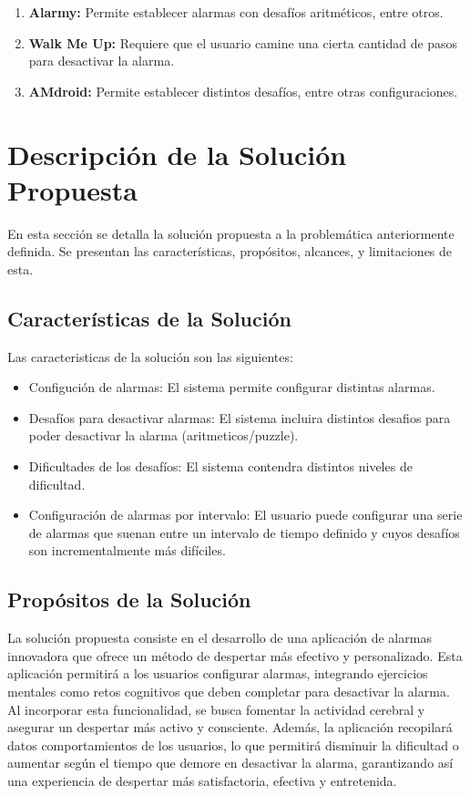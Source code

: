 \documentclass[letterpaper, 10pt]{article}
\begin{document}
	\begin{enumerate}
		\item[] \textbf{Alarmy:} Permite establecer alarmas con desafíos aritméticos, entre otros.
		\item[] \textbf{Walk Me Up:} Requiere que el usuario camine una cierta cantidad de pasos para desactivar la alarma.
		\item[] \textbf{AMdroid:} Permite establecer distintos desafíos, entre otras configuraciones.
	\end{enumerate}

\section{Descripción de la Solución Propuesta}
En esta sección se detalla la solución propuesta a la problemática anteriormente definida. Se presentan las características, propósitos, alcances, y limitaciones de esta.
\subsection{Características de la Solución}
Las caracteristicas de la solución son las siguientes:

\begin{itemize}
    \item Configución de alarmas: El sistema permite configurar distintas alarmas.
    \item Desafíos para desactivar alarmas: El sistema incluira distintos desafios para poder desactivar la alarma (aritmeticos/puzzle).
    \item Dificultades de los desafíos: El sistema contendra distintos niveles de dificultad.
    \item Configuración de alarmas por intervalo: El usuario puede configurar una serie de alarmas que suenan entre un intervalo de tiempo definido y cuyos desafíos son incrementalmente más difíciles.
\end{itemize}
\subsection{Propósitos de la Solución}
La solución propuesta consiste en el desarrollo de una aplicación de alarmas innovadora que ofrece un método de despertar más efectivo y personalizado. Esta aplicación permitirá a los usuarios configurar alarmas, integrando ejercicios mentales como retos cognitivos que deben completar para desactivar la alarma. Al incorporar esta funcionalidad, se busca fomentar la actividad cerebral y asegurar un despertar más activo y consciente. Además, la aplicación recopilará datos comportamientos de los usuarios, lo que permitirá disminuir la dificultad o aumentar según el tiempo que demore en desactivar la alarma, garantizando así una experiencia de despertar más satisfactoria, efectiva y entretenida.
 
\end{document}
